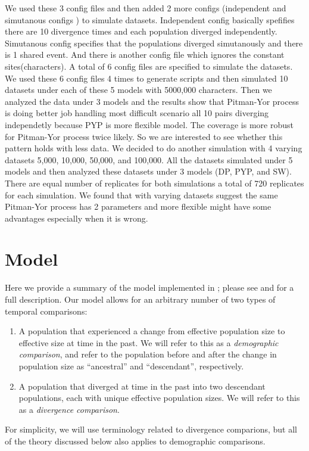 \documentclass[letterpaper,12pt]{article}
\begin{document}
We used these 3 config files and then added 2 more configs (independent and simutanous configs ) to simulate datasets. Independent config 
basically spefifies there are 10 divergence times and each population diverged independently. Simutanous config specifies that the populations 
diverged simutanously and there is 1 shared event. And there is another config file which ignores the constant sites(characters). A total of 6 config 
files are specified to simulate the datasets. We used these 6 config files 4 times to generate scripts and then simulated 10 datasets under each of 
these 5 models with 5000,000 characters. Then we analyzed the data under 3 models and the results show that Pitman-Yor process is doing better job handling 
most difficult scenario all 10 pairs diverging independetly because PYP is more flexible model. The coverage is more robust for Pitman-Yor process twice likely.
So we are interested to see whether this pattern holds with less data. We decided to do another simulation with 4 varying datasets 5,000, 10,000, 50,000, and 100,000. 
All the datasets simulated under 5 models and then analyzed these datasets under 3 models (DP, PYP, and SW). There are equal number of replicates for both simulations 
a total of 720 replicates for each simulation. We found that with varying datasets suggest the same Pitman-Yor process has 2 parameters and more flexible might 
have some advantages especially when it is wrong.

\section{Model}

Here we provide a summary of the model implemented in \ecoevolity; please see
\citet{Oaks2018ecoevolity} and \citet{Oaks2019codemog} for a full description.
Our model allows for an arbitrary number of two types of temporal comparisons:
\begin{enumerate}
    \item A population that experienced a change from effective population size
        \epopsize[\rootpopindex]
        to effective size
        \epopsize[\descendantpopindex{}]
        at time \comparisonetime in the past.
        We will refer to this as a \emph{demographic comparison},
        and refer to the population before and after the change in population
        size as ``ancestral'' and ``descendant'', respectively.
    \item A population that diverged at time \comparisonetime in the past into
        two descendant populations, each with unique effective population
        sizes.
        We will refer to this as a \emph{divergence comparison}.
\end{enumerate}
For simplicity, we will use terminology related to divergence comparions, but
all of the theory discussed below also applies to demographic comparisons.
\end{document}
